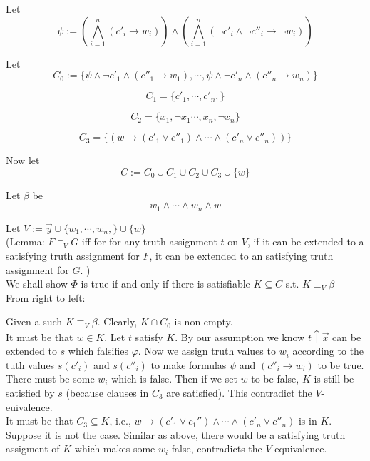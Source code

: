 \documentclass[12pt]{article}
\begin{document}
Let $$\psi:= \left(\bigwedge_{i=1}^n (c'_i\rightarrow w_i)\right)\wedge 
\left(\bigwedge_{i=1}^n(\neg c'_i\wedge \neg c''_i\rightarrow \neg w_i)\right)$$

Let $$C_0:=\{\psi\wedge \neg c'_1\wedge  (c''_1\rightarrow w_1) , \cdots, \psi\wedge\neg c'_n\wedge (c''_n\rightarrow w_n)\}$$

$$C_1=\{c'_1, \cdots, c'_n, \}$$

$$C_2=\{x_1,\neg x_1\cdots, x_n,\neg x_n\}$$

$$C_3=\{(w\rightarrow (c'_1\vee c''_1)\wedge\cdots\wedge (c'_n\vee c''_n))\}$$

Now let $$C:=C_0\cup C_1\cup C_2\cup C_3\cup\{w\}$$

Let $\beta$ be $$ w_1\wedge\cdots\wedge w_n\wedge w$$

Let $V:=\vec{y}\cup\{w_1,\cdots,w_n,\}\cup\{w\}$\\




(Lemma: $F\models_V G$ iff for for any truth assignment $t$ on $V$, if it can be extended to a satisfying truth assignment for $F$, it can be extended to an satisfying truth assignment for $G$. 
) \\

We shall show $\Phi$ is true if and only if there is satisfiable $K\subseteq C$ s.t. $K\equiv_V \beta$\\



\color{red} From right to left:\color{black}

Given a such $K\equiv_V \beta$. 
Clearly, $K\cap C_0$ is non-empty.\\



It must be that $w\in K$. 
Let $t$ satisfy $K$. 
By our assumption we know $t\uparrow\vec{x}$ can be extended to $s$ which falsifies $\varphi$. Now we assign truth values to $w_i$ according to the tuth values $s(c'_i)$ and $s(c''_i)$ to make formulas $\psi$ and  $(c''_i\rightarrow w_i)$ to be true. There  must be some $w_i$ which is false. Then if we set $w$ to be false, $K$ is still be satisfied by $s$ (because clauses in $C_3$ are satisfied). This contradict the $V$-euivalence.\\

It must be that $C_3\subseteq K$, i.e., $w\rightarrow (c'_1\vee c_1'')\wedge\cdots\wedge (c'_n\vee c''_n)$ is in $K$. Suppose it is not the case. Similar as above, there would be a satisfying truth assigment of $K$ which makes some $w_i$ false, contradicts the $V$-equivalence. \\
\end{document}
